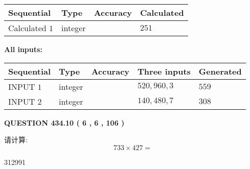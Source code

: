 \documentclass{ctexart}
\begin{document}
   
   
   
\noindent{}
   
   
  
  
\noindent\begin{tabular}{|l|l|l|l|}
\hline
 Sequential & Type & Accuracy & Calculated \\ 
\hline
 
 
  Calculated $  1 $ & integer &  & 
  $ 251 $ 
 \\  \hline  
 \end{tabular}
   
   
   
   
\noindent\vspace{0.1in}\hspace{-0.08in} {\textbf{\Large{All inputs: }}}
   
   
  
  
\noindent\begin{tabular}{|l|l|l|l|l|}
\hline
 Sequential & Type & Accuracy & Three inputs & Generated \\ 
\hline
 
 
  INPUT $  1 $ & integer &  & $
 520
 , 
 960
 , 
 3
 $ & $ 559 $ 
 \\  \hline  
 
 
  INPUT $  2 $ & integer &  & $
 140
 , 
 480
 , 
 7
 $ & $ 308 $ 
 \\  \hline  
 \end{tabular}
   
   
  
\vspace{0.2in}
  
{\textbf{\Large{QUESTION
434.10 
 ( 6 , 6 , 106 )
}}}
  
  
 
请计算:
\begin{equation}
733  \times    %
427 = \nonumber
\end{equation}
 
 
 
\noindent{}
 
 

312991
 
 
\noindent{}
 
 

 
 
 
\noindent{}
 
\end{document}
